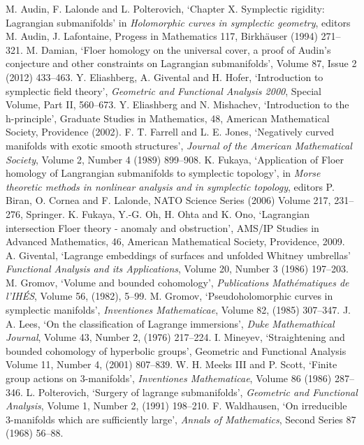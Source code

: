 \documentclass{amsart}
\begin{document}
\begin{thebibliography}{1}
 M. Audin, F. Lalonde and L. Polterovich, `Chapter X. Symplectic rigidity: Lagrangian submanifolds' in \emph{Holomorphic curves in symplectic geometry}, editors M. Audin, J. Lafontaine, Progess in Mathematics 117, Birkh\"{a}user (1994) 271--321.
 M. Damian, `Floer homology on the universal cover, a proof of Audin's conjecture and other constraints on Lagrangian submanifolds', Volume 87, Issue 2 (2012) 433--463.
 Y. Eliashberg, A. Givental and H. Hofer, `Introduction to symplectic field theory', {\em Geometric and Functional Analysis 2000}, Special Volume, Part II, 560--673.
 Y. Eliashberg and N. Mishachev, `Introduction to the h-principle', Graduate Studies in Mathematics, 48, American Mathematical Society, Providence (2002).
 F. T. Farrell and L. E. Jones, `Negatively curved manifolds with exotic smooth structures', {\em Journal of the American Mathematical Society}, Volume 2, Number 4 (1989) 899--908.
 K. Fukaya, `Application of Floer homology of Langrangian submanifolds to symplectic topology', in {\em Morse theoretic methods in nonlinear analysis and in symplectic topology}, editors P. Biran, O. Cornea and F. Lalonde, NATO Science Series (2006) Volume 217, 231--276, Springer.
 K. Fukaya, Y.-G. Oh, H. Ohta and K. Ono, `Lagrangian intersection Floer theory - anomaly and obstruction', AMS/IP
Studies in Advanced Mathematics, 46, American Mathematical Society, Providence, 2009.
 A. Givental, `Lagrange embeddings of surfaces and unfolded Whitney umbrellas' {\em Functional Analysis and its Applications}, Volume 20, Number 3 (1986) 197--203.
 M. Gromov, `Volume and bounded cohomology', {\em Publications Math\'{e}matiques de l'IH\'{E}S}, Volume 56, (1982), 5--99.
 M. Gromov, `Pseudoholomorphic curves in symplectic manifolds', {\em Inventiones Mathematicae}, Volume 82, (1985) 307--347.
 J. A. Lees, `On the classification of Lagrange immersions', {\em Duke Mathemathical Journal}, Volume 43, Number 2, (1976) 217--224.
 I. Mineyev, `Straightening and bounded cohomology of hyperbolic groups', Geometric and Functional Analysis Volume 11, Number 4, (2001) 807--839.
 W. H. Meeks III and P. Scott, `Finite group actions on 3-manifolds', {\em Inventiones Mathematicae}, Volume 86 (1986) 287--346.
 L. Polterovich, `Surgery of lagrange submanifolds', {\em Geometric and Functional Analysis}, Volume 1, Number 2, (1991) 198--210.
 F. Waldhausen, `On irreducible 3-manifolds which are sufficiently large', {\em Annals of Mathematics}, Second Series 87 (1968) 56--88.
\end{thebibliography}
\end{document}
